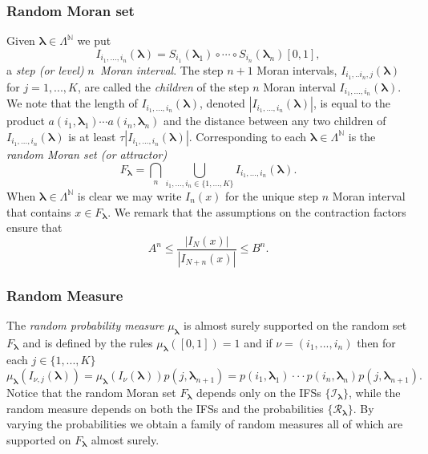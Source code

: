 \documentclass{amsart}
\theoremstyle{plain}
\numberwithin{equation}{section}
\newcommand{\N}{{\mathbb N}}
\newcommand{\cI}{{\mathcal I}}
\newcommand{\cR}{{\mathcal R}}
\newcommand{\blambda}{{\boldsymbol{\lambda}}}
\begin{document}
\subsubsection{Random Moran set}

Given ${\blambda}\in \Lambda^\N$ we put 
\begin{equation*}
      I_{i_{1},...,i_{n}}({\blambda})=S_{i_{1}}(\blambda_{1})\circ \cdots \circ S_{i_{n}}(\blambda_{n})[0,1],
\end{equation*}
a \textit{step (or level)} $n$\textit{\ Moran interval}. 
The step $n+1$ Moran intervals, $I_{i_{1},..i_{n},j}({\blambda})$ for $j=1,...,K$, are called the \textit{children} of the step $n$ Moran interval $I_{i_{1},...,i_{n}}({\blambda})$. 
We note that the length of $I_{i_{1},...,i_{n}}({\blambda})$, denoted 
$\left| I_{i_{1},...,i_{n}}({\blambda})\right|$, is equal to the product $a(i_{1},{\blambda}_{1})\cdots a(i_{n},{\blambda}_{n})$ 
and the distance between any two children of $I_{i_{1},...,i_{n}}({\blambda})$ is at least $\tau \left| I_{i_{1},...,i_{n}}({\blambda})\right|$. 
Corresponding to each $\blambda\in \Lambda^\N$ is the \textit{random Moran set (or attractor)} 
\begin{equation*}
     F_\blambda=\bigcap_{n}\bigcup_{i_{1},...,i_{n}\in \{1,...,K\}}I_{i_{1},...,i_{n}}(\blambda).
\end{equation*}
When ${\blambda}\in \Lambda^\N$ is clear we may write $I_{n}(x)$
for the unique step $n$ Moran interval that contains $x\in F_{\blambda}$. 
We remark that the assumptions on the contraction factors ensure that 
\begin{equation*}
    A^{n}\leq \frac{\left| I_{N}(x)\right|}{\left| I_{N+n}(x)\right|}\leq B^{n}.
\end{equation*}

\subsubsection{Random Measure}

The \textit{random probability measure} $\mu_\blambda$ is almost surely supported on the random set $F_{\mathbf\lambda}$ and is
defined by the rules $\mu_\blambda([0,1])=1$ and if $\nu=(i_{1},...,i_{n})$ then for each $j\in \{1,...,K\}$ 
\begin{equation*}
   \mu_\blambda(I_{\nu ,j}(\blambda))=\mu_\blambda(I_{\nu}(\blambda))p(j,\blambda_{n+1})=
        p(i_{1},\blambda_{1})\cdot \cdot \cdot p(i_{n},\blambda_{n})p(j,\blambda_{n+1}).
\end{equation*}
Notice that the random Moran set $F_\blambda$ depends only on the IFSs $\{\cI_\blambda\}$, while the random measure depends on both the IFSs
and the probabilities $\{\cR_\blambda\}$. 
By varying the probabilities we obtain a family of random measures all of which are supported on $F_\blambda$ almost surely.
\end{document}
